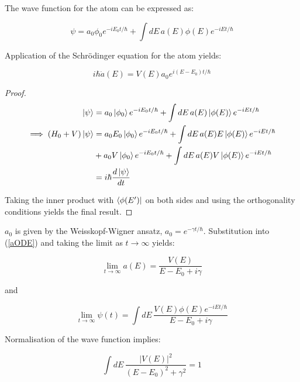 \documentclass{article}
\begin{document}
\noindent The wave function for the atom can be expressed as:

\begin{equation}
	\psi = a_0\phi_0e^{-iE_0t/\hbar}+\int dE\, a(E)\phi(E)e^{-iEt/\hbar}
\end{equation}

\noindent Application of the Schr{\"o}dinger equation for the atom yields:

\begin{equation}
	i\hbar \dot{a}(E) = V(E)a_0e^{i(E-E_0)t/\hbar}
	\label{aODE}
\end{equation}


\begin{proof}
\begin{subequations}
\begin{align}
	\ket{\psi} &= a_0\ket{\phi_0}e^{-iE_0t/\hbar}+\int dE\,a(E)\ket{\phi(E)}e^{-iEt/\hbar} \\
	\implies (H_0+V)\ket{\psi} &= a_0E_0\ket{\phi_0}e^{-iE_0t/\hbar}+\int dE\, a(E)E\ket{\phi(E)}e^{-iEt/\hbar} \\ 
				   &+a_0V\ket{\phi_0}e^{-iE_0t/\hbar}+\int dE\, a(E)V\ket{\phi(E)}e^{-iEt/\hbar} \nonumber\\
				   &= i\hbar \frac{d\ket{\psi}}{dt}
\end{align}
\end{subequations}

\noindent Taking the inner product with $\bra{\phi(E')}$ on both sides and using the orthogonality conditions yields the final result.
\end{proof}
\noindent $a_0$ is given by the Weisskopf-Wigner ansatz, $a_0 = e^{-\gamma t/\hbar}$. Substitution into (\ref{aODE}) and taking the limit as $t \rightarrow \infty$ yields:

\begin{equation}
	\lim_{t\to\infty}a(E) = \frac{V(E)}{E-E_0+i\gamma}
\end{equation}

\noindent and 

\begin{equation}
	\lim_{t\to\infty}\psi(t) = \int dE\,\frac{V(E)\phi(E)e^{-iEt/\hbar}}{E-E_0+i\gamma}
\end{equation}

\noindent Normalisation of the wave function implies:

\begin{equation}
	\int dE\,\frac{|V(E)|^2}{(E-E_0)^2+\gamma^2}=1
	\label{atomdecaynormalisation}
\end{equation}
\end{document}
